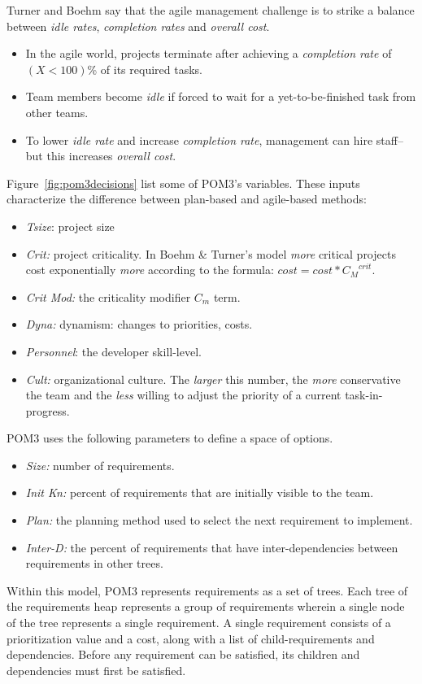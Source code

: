 \documentclass[10pt,journal,compsoc]{IEEEtran}
\newcommand{\bi}{\begin{itemize}}
\newcommand{\ei}{\end{itemize}}
\newcommand{\fig}[1]{Figure~\ref{fig:#1}}
\newenvironment{changed}{\par}{\par}
\begin{document}
\begin{changed}
Turner and Boehm say that the agile management challenge is to strike a balance between {\em idle rates}, {\em completion rates} and {\em overall cost}. 
\bi
\item
In the agile world, projects terminate after achieving a {\em completion rate} of   $(X<100)$\% of its required tasks.
\item
Team members  become {\em idle} if forced to wait for a yet-to-be-finished task from other teams. 
\item
To lower {\em idle rate} and increase {\em completion rate}, management can hire staff--but this increases  {\em overall cost}.
\ei
\end{changed}
\fig{pom3decisions}  list some of POM3's variables.
These inputs characterize the difference between plan-based and agile-based methods:
\bi
\item {\em Tsize}: project size
\item {\em Crit:} project criticality. In Boehm \& Turner's model
 {\em more} critical projects cost exponentially {\em more} 
according to the formula: $\textit{cost} = \textit{cost} * {C_M}^{\textit{crit}}$.
\item {\em Crit Mod:} the criticality modifier $C_m$ term.
\item {\em Dyna:} dynamism: changes to priorities, costs.
\item {\em Personnel}: the developer skill-level.
\item  {\em Cult:} organizational culture. The {\em larger} this number, the {\em more} conservative
the team and the {\em less} willing to adjust the priority of a current task-in-progress.
\ei
POM3 uses the following parameters to define a space of options.
\bi
\item {\em Size:} number of requirements.
\item {\em Init Kn:} percent of requirements that are initially visible to the team.
\item {\em Plan:} the planning method used to select the next requirement to implement.
\item {\em Inter-D:}  the percent of requirements that have inter-dependencies 
between requirements in other trees.
\ei

  Within this model, POM3 represents requirements as a set of trees.  
    Each tree of the requirements
    heap represents a group of requirements wherein a single node of the
    tree represents a single requirement.  A single requirement consists
    of a prioritization value and a cost, along with a list of
    child-requirements and dependencies.  Before any requirement can be
    satisfied, its children and dependencies must first be satisfied.
    
\end{document}
